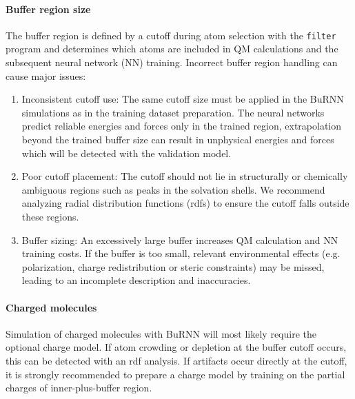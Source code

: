 \paragraph{Buffer region size}
The buffer region is defined by a cutoff during atom selection with the \texttt{filter} program and determines which atoms are included in QM calculations and the subsequent neural network (NN) training. Incorrect buffer region handling can cause major issues:

\begin{enumerate}
  \item[-] Inconsistent cutoff use: The same cutoff size must be applied in the BuRNN simulations as in the training dataset preparation. The neural networks predict reliable energies and forces only in the trained region, extrapolation beyond the trained buffer size can result in unphysical energies and forces which will be detected with the validation model.
  \item[-] Poor cutoff placement: The cutoff should not lie in structurally or chemically ambiguous regions such as peaks in the solvation shells. We recommend analyzing radial distribution functions (rdfs) to ensure the cutoff falls outside these regions.
  \item[-] Buffer sizing: An excessively large buffer increases QM calculation and NN training costs. If the buffer is too small, relevant environmental effects (e.g. polarization, charge redistribution or steric constraints) may be missed, leading to an incomplete description and inaccuracies.
\end{enumerate}

\paragraph{Charged molecules}
Simulation of charged molecules with BuRNN will most likely require the optional charge model. 
If atom crowding or depletion at the buffer cutoff occurs, this can be detected with an rdf analysis. If artifacts occur directly at the cutoff, it is strongly recommended to prepare a charge model by training on the partial charges of inner-plus-buffer region.

